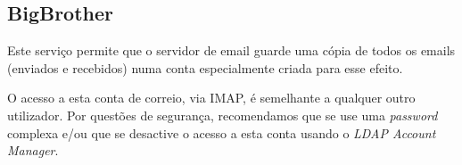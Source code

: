 \subsection{BigBrother}

Este serviço permite que o servidor de email guarde uma cópia de todos os emails (enviados e recebidos) numa conta especialmente criada para esse efeito.

O acesso a esta conta de correio, via IMAP, é semelhante a qualquer outro utilizador. Por questões de segurança, recomendamos que se use uma \emph{password} complexa e/ou que se desactive o acesso a esta conta usando o \emph{LDAP Account Manager}.
